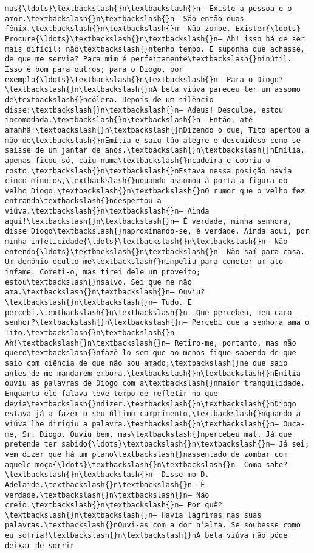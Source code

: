 \documentclass[11pt]{article}
\begin{document}
\begin{Verbatim}[commandchars=\\\{\}]
mas{\ldots}\textbackslash{}n\textbackslash{}n— Existe a pessoa e o amor.\textbackslash{}n\textbackslash{}n— São então duas fênix.\textbackslash{}n\textbackslash{}n— Não zombe. Existem{\ldots} Procure{\ldots}\textbackslash{}n\textbackslash{}n— Ah! isso há de ser mais difícil: não\textbackslash{}ntenho tempo. E suponha que achasse, de que me servia? Para mim é perfeitamente\textbackslash{}ninútil. Isso é bom para outros; para o Diogo, por exemplo{\ldots}\textbackslash{}n\textbackslash{}n— Para o Diogo?\textbackslash{}n\textbackslash{}nA bela viúva pareceu ter um assomo de\textbackslash{}ncólera. Depois de um silêncio disse:\textbackslash{}n\textbackslash{}n— Adeus! Desculpe, estou incomodada.\textbackslash{}n\textbackslash{}n— Então, até amanhã!\textbackslash{}n\textbackslash{}nDizendo o que, Tito apertou a mão de\textbackslash{}nEmília e saiu tão alegre e descuidoso como se saísse de um jantar de anos.\textbackslash{}n\textbackslash{}nEmília, apenas ficou só, caiu numa\textbackslash{}ncadeira e cobriu o rosto.\textbackslash{}n\textbackslash{}nEstava nessa posição havia cinco minutos,\textbackslash{}nquando assomou à porta a figura do velho Diogo.\textbackslash{}n\textbackslash{}nO rumor que o velho fez entrando\textbackslash{}ndespertou a viúva.\textbackslash{}n\textbackslash{}n— Ainda aqui!\textbackslash{}n\textbackslash{}n— É verdade, minha senhora, disse Diogo\textbackslash{}naproximando-se, é verdade. Ainda aqui, por minha infelicidade{\ldots}\textbackslash{}n\textbackslash{}n— Não entendo{\ldots}\textbackslash{}n\textbackslash{}n— Não saí para casa. Um demônio oculto me\textbackslash{}nimpeliu para cometer um ato infame. Cometi-o, mas tirei dele um proveito; estou\textbackslash{}nsalvo. Sei que me não ama.\textbackslash{}n\textbackslash{}n— Ouviu?\textbackslash{}n\textbackslash{}n— Tudo. E percebi.\textbackslash{}n\textbackslash{}n— Que percebeu, meu caro senhor?\textbackslash{}n\textbackslash{}n— Percebi que a senhora ama o Tito.\textbackslash{}n\textbackslash{}n— Ah!\textbackslash{}n\textbackslash{}n— Retiro-me, portanto, mas não quero\textbackslash{}nfazê-lo sem que ao menos fique sabendo de que saio com ciência de que não sou amado;\textbackslash{}ne que saio antes de me mandarem embora.\textbackslash{}n\textbackslash{}nEmília ouviu as palavras de Diogo com a\textbackslash{}nmaior tranqüilidade. Enquanto ele falava teve tempo de refletir no que devia\textbackslash{}ndizer.\textbackslash{}n\textbackslash{}nDiogo estava já a fazer o seu último cumprimento,\textbackslash{}nquando a viúva lhe dirigiu a palavra.\textbackslash{}n\textbackslash{}n— Ouça-me, Sr. Diogo. Ouviu bem, mas\textbackslash{}npercebeu mal. Já que pretende ter sabido{\ldots}\textbackslash{}n\textbackslash{}n— Já sei; vem dizer que há um plano\textbackslash{}nassentado de zombar com aquele moço{\ldots}\textbackslash{}n\textbackslash{}n— Como sabe?\textbackslash{}n\textbackslash{}n— Disse-mo D. Adelaide.\textbackslash{}n\textbackslash{}n— É verdade.\textbackslash{}n\textbackslash{}n— Não creio.\textbackslash{}n\textbackslash{}n— Por quê?\textbackslash{}n\textbackslash{}n— Havia lágrimas nas suas palavras.\textbackslash{}nOuvi-as com a dor n’alma. Se soubesse como eu sofria!\textbackslash{}n\textbackslash{}nA bela viúva não pôde deixar de sorrir 
\end{Verbatim}
\end{document}
